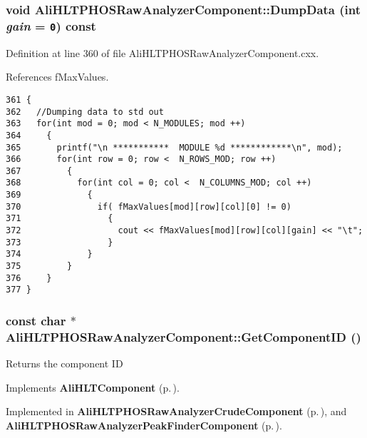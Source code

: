 \subsubsection{\setlength{\rightskip}{0pt plus 5cm}void Ali\-HLTPHOSRaw\-Analyzer\-Component::Dump\-Data (int {\em gain} = {\tt 0}) const}\label{classAliHLTPHOSRawAnalyzerComponent_a7}




Definition at line 360 of file Ali\-HLTPHOSRaw\-Analyzer\-Component.cxx.

References f\-Max\-Values.

\footnotesize\begin{verbatim}361 {
362   //Dumping data to std out
363   for(int mod = 0; mod < N_MODULES; mod ++)
364     {
365       printf("\n ***********  MODULE %d ************\n", mod);
366       for(int row = 0; row <  N_ROWS_MOD; row ++)
367         {
368           for(int col = 0; col <  N_COLUMNS_MOD; col ++)
369             {
370               if( fMaxValues[mod][row][col][0] != 0)
371                 { 
372                   cout << fMaxValues[mod][row][col][gain] << "\t";
373                 }
374             }
375         } 
376     }
377 }
\end{verbatim}\normalsize 


\subsubsection{\setlength{\rightskip}{0pt plus 5cm}const char $\ast$ Ali\-HLTPHOSRaw\-Analyzer\-Component::Get\-Component\-ID ()\hspace{0.3cm}{\tt  [pure virtual]}}\label{classAliHLTPHOSRawAnalyzerComponent_a12}


Returns the component ID 

Implements {\bf Ali\-HLTComponent} {\rm (p.\,\pageref{classAliHLTComponent_a9})}.

Implemented in {\bf Ali\-HLTPHOSRaw\-Analyzer\-Crude\-Component} {\rm (p.\,\pageref{classAliHLTPHOSRawAnalyzerCrudeComponent_a4})}, and {\bf Ali\-HLTPHOSRaw\-Analyzer\-Peak\-Finder\-Component} {\rm (p.\,\pageref{classAliHLTPHOSRawAnalyzerPeakFinderComponent_a2})}.

